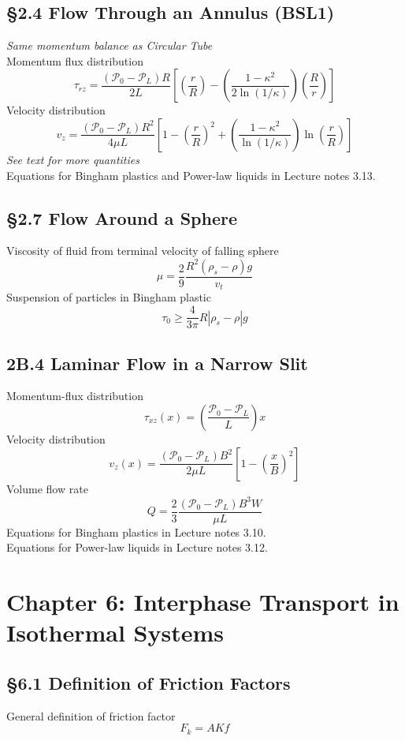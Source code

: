 \subsection{\S2.4 Flow Through an Annulus (BSL1)}
\textit{Same momentum balance as Circular Tube}\\
Momentum flux distribution
\[
	\tau_{rz}=\frac{(\mathscr{P}_0-\mathscr{P}_L)R}{2L}\left[\left(\frac{r}{R}\right)-\left(\frac{1-\kappa^2}{2\ln(1/\kappa)}\right)\left(\frac{R}{r}\right)\right]\tag{2.4-12}
\]
Velocity distribution
\[
	v_z=\frac{(\mathscr{P}_0-\mathscr{P}_L)R^2}{4\mu L}\left[1-\left(\frac{r}{R}\right)^2+\left(\frac{1-\kappa^2}{\ln(1/\kappa)}\right)\ln\left(\frac{r}{R}\right)\right]\tag{2.4-13}
\]
\textit{See text for more quantities}\\
Equations for Bingham plastics and Power-law liquids in Lecture notes 3.13.
\subsection{\S2.7 Flow Around a Sphere}
Viscosity of fluid from terminal velocity of falling sphere
\[
	\mu=\frac{2}{9}\frac{R^2(\rho_s-\rho)g}{v_t}\tag{2.7-17}
\]
Suspension of particles in Bingham plastic
\[
	\tau_0\geq\frac{4}{3\pi}R\left|\rho_s-\rho\right|g\tag{Lecture notes 3.21}
\]
\subsection{2B.4 Laminar Flow in a Narrow Slit}
Momentum-flux distribution
\[
	\tau_{xz}(x)=\left(\frac{\mathscr{P}_0-\mathscr{P}_L}{L}\right)x\tag{2B.4-1}
\]
Velocity distribution
\[
	v_z(x)=\frac{(\mathscr{P}_0-\mathscr{P}_L)B^2}{2\mu L}\left[1-\left(\frac{x}{B}\right)^2\right]\tag{2B.4-2}
\]
Volume flow rate
\[
	Q=\frac{2}{3}\frac{(\mathscr{P}_0-\mathscr{P}_L)B^3W}{\mu L}
\]
Equations for Bingham plastics in Lecture notes 3.10.\\
Equations for Power-law liquids in Lecture notes 3.12.
\section{Chapter 6: Interphase Transport in Isothermal Systems}
\subsection{\S6.1 Definition of Friction Factors}
General definition of friction factor
\[
	F_k=AKf\tag{6.1-1}
\]
